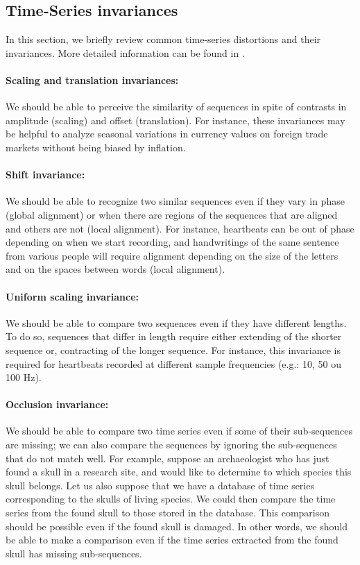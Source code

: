 \subsection{Time-Series invariances}
In this section, we briefly review common time-series distortions and their invariances. More detailed information can be found in \cite{batista2014cid}. 

\paragraph{Scaling and translation invariances:} We should be able to perceive the similarity of sequences in spite of contrasts in amplitude (scaling) and offset (translation). For instance, these invariances may be helpful to analyze seasonal variations in currency values on foreign trade markets without being biased by inflation.


\paragraph{Shift invariance:}  We should be able to recognize two similar sequences even if they vary in phase (global alignment) or when there are regions of the sequences that are aligned and others are not (local alignment). For instance, heartbeats can be out of phase depending on when we start recording, and handwritings of the same sentence from various people will require alignment depending on the size of the letters and on the spaces between words (local alignment).


\paragraph{Uniform scaling invariance:} We should be able to compare two sequences even if they have different lengths. To do so, sequences that differ in length require either extending of the shorter sequence or, contracting of the longer sequence. For instance, this invariance is required for  heartbeats recorded at different sample frequencies  (e.g.: 10, 50 ou 100 Hz).  

\paragraph{Occlusion invariance:} We should be able to compare two time series even if some of their sub-sequences  are missing; we can also compare the sequences by ignoring the sub-sequences that do not match well.  For example, suppose an archaeologist who has just found a skull in a research site, and  would like to determine to which species this skull belongs. Let us also suppose that we have a database of time series corresponding to the skulls of living species. We could then compare the time series from the found skull to those stored in the database. This comparison should be possible even if the found skull is damaged. In other words, we should be able to make a comparison even if the time series extracted from the found skull has missing sub-sequences.

